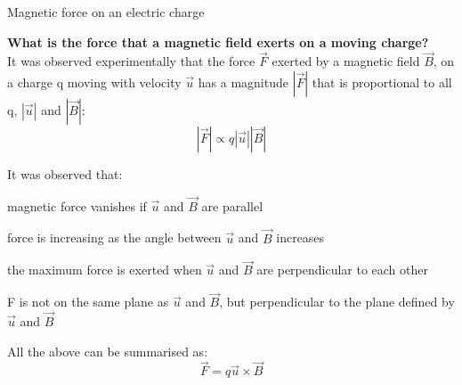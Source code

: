 %
%
%

\begin{frame}{Magnetic force on an electric charge}

{\bf What is the force that a magnetic field exerts on a moving charge?}\\
\vspace{0.2cm}
It was observed experimentally that the force $\vec{F}$ exerted by a magnetic field $\vec{B}$,
on a charge q moving with velocity $\vec{u}$ has a magnitude $|\vec{F}|$  that is proportional to all q,
$|\vec{u}|$ and $|\vec{B}|$:
\begin{equation*}
  |\vec{F}| \propto q |\vec{u}| |\vec{B}|
\end{equation*}

It was observed that:
\begin{itemize}
{\small
  \item magnetic force vanishes if $\vec{u}$ and $\vec{B}$ are parallel
  \item force is increasing as the angle between $\vec{u}$ and $\vec{B}$ increases
  \item the maximum force is exerted when $\vec{u}$ and $\vec{B}$ are perpendicular to each other
  \item F is not on the same plane as $\vec{u}$ and $\vec{B}$,
            but perpendicular to the plane defined by $\vec{u}$ and $\vec{B}$
}
\end{itemize}

All the above can be summarised as:
\begin{equation*}
  \vec{F} = q \vec{u} \times \vec{B}
\end{equation*}

\end{frame}

%
%
%

